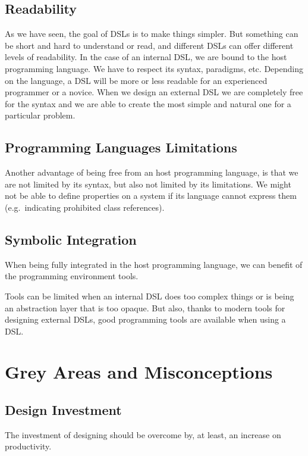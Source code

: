 \documentclass{proc}
\begin{document}
\subsection{Readability}
As we have seen, the goal of DSLs is to make things simpler. But something can
be short and hard to understand or read, and different DSLs can offer different
levels of readability. In the case of an internal DSL, we are bound to the host
programming language. We have to respect its syntax, paradigms, etc. Depending
on the language, a DSL will be more or less readable for an experienced
programmer or a novice. When we design an external DSL we are completely free
for the syntax and we are able to create the most simple and natural one for a
particular problem.

\subsection{Programming Languages Limitations}
Another advantage of being free from an host programming language, is that we
are not limited by its syntax, but also not limited by its limitations. We might
not be able to define properties on a system if its language cannot express them
(e.g.\ indicating prohibited class references).

\subsection{Symbolic Integration}
When being fully integrated in the host programming language, we can benefit of
the programming environment tools.

Tools can be limited when an internal DSL does too complex things or is being an
abstraction layer that is too opaque. But also, thanks to modern tools for
designing external DSLs, good programming tools are available when using a DSL\@.



\section{Grey Areas and Misconceptions}
\label{grey}

\subsection{Design Investment}
The investment of designing should be overcome by, at least, an increase on
productivity.
\end{document}
